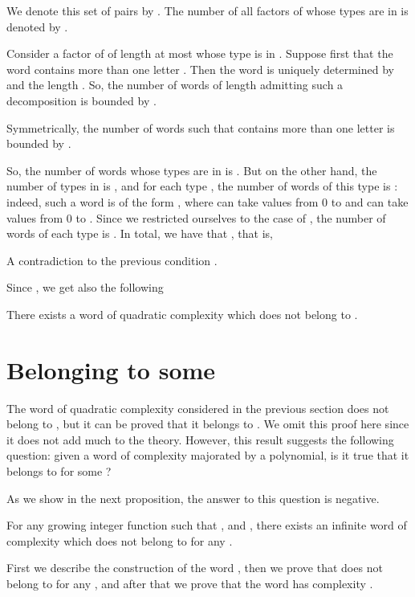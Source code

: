 \documentclass[runningheads,envcountsect,envcountsame]{llncs}
\begin{document}
We denote this set of pairs by . The number of all factors  of  whose types are in  is denoted by .

Consider a factor  of  of length at most  whose type is in . Suppose first that the word  contains more than one letter . Then the word  is uniquely determined by  and the length . So, the number of words  of length  admitting such a decomposition is bounded by .

Symmetrically, the number of words  such that  contains more than one letter  is bounded by .

So, the number  of words whose types are in  is . But on the other hand, the number of types in  is , and for each type , the number of words of this type is : indeed, such a word is of the form , where  can take  values from 0 to  and  can take  values from 0 to . Since we restricted ourselves to the case of , the number of words of each type is . In total, we have that
, that is,

A contradiction to the previous condition . \hfill 

\medskip
Since , we get also the following
\begin{corollary}
        There exists a word of quadratic complexity which does not belong to .
\end{corollary}

\section{Belonging to some }

The word  of quadratic complexity considered in the previous section does not belong to , but it can be proved that it belongs to . We omit this proof here since it does not add much to the theory. However, this result suggests the following question: given a word of complexity majorated by a polynomial, is it true that it belongs to  for some ?

As we show in the next proposition, the answer to this question is
negative.


\begin{proposition}\label{n2fn} For any growing integer function  such that ,  and , there exists an infinite
word  of complexity  which does not belong to
 for any .\end{proposition}

First we describe the construction of the word , then we prove
that  does not belong to  for any , and after that we prove
that the word has complexity .
\end{document}
